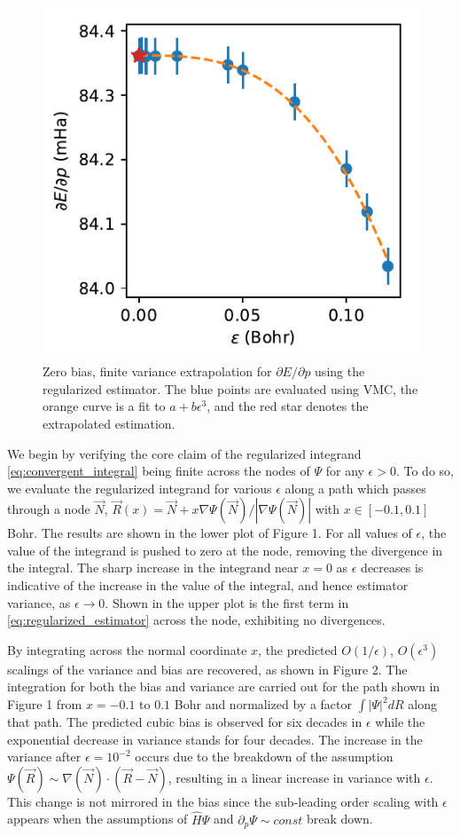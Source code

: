 \documentclass[twocolumn]{revtex4-1}
\begin{document}
\begin{figure}
\includegraphics{../2_plots/dedp.pdf}
\caption{Zero bias, finite variance extrapolation for $\partial E/\partial p$ using the regularized estimator. The blue points are evaluated using VMC, the orange curve is a fit to $a + b\epsilon^3$, and the red star denotes the extrapolated estimation. }
\end{figure}

We begin by verifying the core claim of the regularized integrand \eqref{eq:convergent_integral} being finite across the nodes of $\Psi$ for any $\epsilon > 0$.
To do so, we evaluate the regularized integrand for various $\epsilon$ along a path which passes through a node $\vec{N}$, $\vec{R}(x) = \vec{N} + x \nabla \Psi(\vec{N})/|\nabla \Psi(\vec{N})|$ with $x \in [-0.1, 0.1]$ Bohr.
The results are shown in the lower plot of Figure 1.
For all values of $\epsilon$, the value of the integrand is pushed to zero at the node, removing the divergence in the integral.
The sharp increase in the integrand near $x=0$ as $\epsilon$ decreases is indicative of the increase in the value of the integral, and hence estimator variance, as $\epsilon \rightarrow 0$.
Shown in the upper plot is the first term in \eqref{eq:regularized_estimator} across the node, exhibiting no divergences.

By integrating across the normal coordinate $x$, the predicted $O(1/\epsilon)$, $O(\epsilon^3)$ scalings of the variance and bias are recovered, as shown in Figure 2.
The integration for both the bias and variance are carried out for the path shown in Figure 1 from $x = -0.1$ to $0.1$ Bohr and normalized by a factor $\int |\Psi|^2 dR$ along that path.
The predicted cubic bias is observed for six decades in $\epsilon$ while the exponential decrease in variance stands for four decades.
The increase in the variance after $\epsilon = 10^{-2}$ occurs due to the breakdown of the assumption $\Psi(\vec{R}) \sim \nabla(\vec{N}) \cdot (\vec{R}-\vec{N})$, resulting in a linear increase in variance with $\epsilon$.
This change is not mirrored in the bias since the sub-leading order scaling with $\epsilon$ appears when the assumptions of $\hat{H}\Psi$ and $\partial_p \Psi \sim const$ break down.
\end{document}
